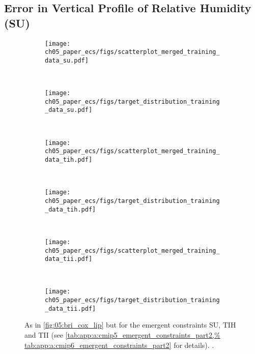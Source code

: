 \subsection{Error in Vertical Profile of Relative Humidity (SU)}
\label{subsec:05:su}

\begin{figure}[!t]
  \centering
  \begin{subfigure}[b]{\SubfigureWidth{}}
    \texttt{[image: 
      ch05\_paper\_ecs/figs/scatterplot\_merged\_training\_data\_su.pdf]}
    \caption{}
    \label{fig:05:su_tih_tii:a}
  \end{subfigure}
  ~
  \begin{subfigure}[b]{\SubfigureWidth{}}
    \texttt{[image: 
      ch05\_paper\_ecs/figs/target\_distribution\_training\_data\_su.pdf]}
    \caption{}
    \label{fig:05:su_tih_tii:b}
  \end{subfigure}
  \\
  \begin{subfigure}[b]{\SubfigureWidth{}}
    \texttt{[image: 
      ch05\_paper\_ecs/figs/scatterplot\_merged\_training\_data\_tih.pdf]}
    \caption{}
    \label{fig:05:su_tih_tii:c}
  \end{subfigure}
  ~
  \begin{subfigure}[b]{\SubfigureWidth{}}
    \texttt{[image: 
      ch05\_paper\_ecs/figs/target\_distribution\_training\_data\_tih.pdf]}
    \caption{}
    \label{fig:05:su_tih_tii:d}
  \end{subfigure}
  \\
  \begin{subfigure}[b]{\SubfigureWidth{}}
    \texttt{[image: 
      ch05\_paper\_ecs/figs/scatterplot\_merged\_training\_data\_tii.pdf]}
    \caption{}
    \label{fig:05:su_tih_tii:e}
  \end{subfigure}
  ~
  \begin{subfigure}[b]{\SubfigureWidth{}}
    \texttt{[image: 
      ch05\_paper\_ecs/figs/target\_distribution\_training\_data\_tii.pdf]}
    \caption{}
    \label{fig:05:su_tih_tii:f}
  \end{subfigure}
  \caption[
    As in \cref{fig:05:bri_cox_lip} but for the emergent constraints SU, TIH
    and TII.
  ]{
    As in \cref{fig:05:bri_cox_lip} but for the emergent constraints SU, TIH
    and TII (see \cref{tab:app:a:cmip5_emergent_constraints_part2,%
      tab:app:a:cmip6_emergent_constraints_part2} for details).
    .
  }
  \label{fig:05:su_tih_tii}
\end{figure}

